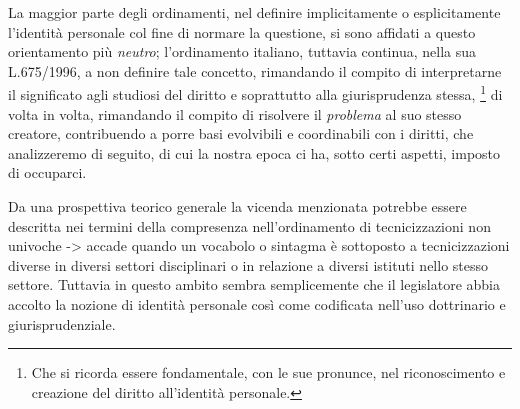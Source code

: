 La maggior parte degli ordinamenti, nel definire implicitamente o esplicitamente l'identità personale col fine di normare la questione, si sono affidati a questo orientamento più \textit{neutro}; l'ordinamento italiano, tuttavia continua, nella sua L.675/1996, a non definire tale concetto, rimandando il compito di interpretarne il significato agli studiosi del diritto e soprattutto alla giurisprudenza stessa, \footnote{Che si ricorda essere fondamentale, con le sue pronunce, nel riconoscimento e creazione del diritto all'identità personale.} di volta in volta, rimandando il compito di risolvere il \textit{problema} al suo stesso creatore, contribuendo a porre basi evolvibili e coordinabili con i diritti, che analizzeremo di seguito, di cui la nostra epoca ci ha, sotto certi aspetti, imposto di occuparci.

Da una prospettiva teorico generale la vicenda menzionata potrebbe essere descritta nei termini della compresenza nell’ordinamento di tecnicizzazioni non univoche -> accade quando un vocabolo o sintagma è sottoposto a tecnicizzazioni diverse in diversi settori disciplinari o in relazione a diversi istituti nello stesso settore.
Tuttavia in questo ambito sembra semplicemente che il legislatore abbia accolto la nozione di identità personale così come codificata nell’uso dottrinario e giurisprudenziale.

